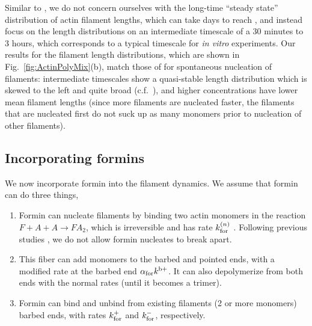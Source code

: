 \documentclass[11pt]{article}
\begin{document}
Similar to \cite{banerjee2022emergence}, we do not concern ourselves with the long-time ``steady state'' distribution of actin filament lengths, which can take days to reach \cite{hu2007theoretical, fass2008stochastic, mohapatra2017limiting}, and instead focus on the length distributions on an intermediate timescale of a 30 minutes to 3 hours, which corresponds to a typical timescale for \emph{in vitro} experiments. Our results for the filament length distributions, which are shown in Fig.\ \ref{fig:ActinPolyMix}(b), match those of \cite{banerjee2022emergence} for spontaneous nucleation of filaments: intermediate timescales show a quasi-stable length distribution which is skewed to the left and quite broad (c.f.\ \cite[Fig.~2c]{banerjee2022emergence}), and higher concentrations have lower mean filament lengths (since more filaments are nucleated faster, the filaments that are nucleated first do not suck up as many monomers prior to nucleation of other filaments). 

\subsection{Incorporating formins}
We now incorporate formin into the filament dynamics. We assume that formin can do three things,
\begin{enumerate}
\item Formin can nucleate filaments by binding two actin monomers in the reaction $F+A+A \rightarrow FA_2$, which is irreversible and has rate $k_\text{for}^{(n)}$ \cite{paul2008role, zweifel2021nucleation}. Following previous studies \cite{paul2008role, zweifel2021nucleation}, we do not allow formin nucleates to break apart.
\item This fiber can add monomers to the barbed and pointed ends, with a modified rate at the barbed end $\alpha_\text{for} k^\text{b+}$. It can also depolymerize from both ends with the normal rates (until it becomes a trimer).
\item Formin can bind and unbind from existing filaments (2 or more monomers) barbed ends, with rates $k_\text{for}^+$ and $k_\text{for}^-$, respectively. 
\end{enumerate}
\end{document}

